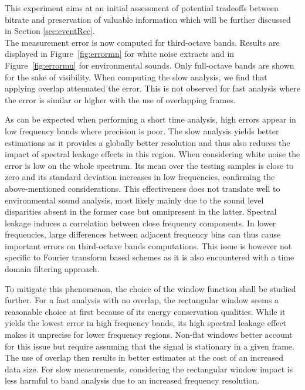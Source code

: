 \documentclass[sensors,article,submit,moreauthors,pdftex,10pt,a4paper]{mdpi}
\begin{document}
This experiment aims at an initial assessment of potential tradeoffs between bitrate and preservation of valuable information which will be further discussed in Section \ref{sec:eventRec}.\\

The measurement error is now computed for third-octave bands. Results are displayed in Figure~\ref{fig:errormn} for white noise extracts and in Figure~\ref{fig:errormu} for environmental sounds. Only full-octave bands are shown for the sake of visibility. When computing the slow analysis, we find that applying overlap attenuated the error. This is not observed for fast analysis where the error is similar or higher with the use of overlapping frames.

As can be expected when performing a short time analysis, high errors appear in low frequency bands where precision is poor. The slow analysis yields better estimations as it provides a globally better resolution and thus also reduces the impact of spectral leakage effects in this region. When considering white noise the error is low on the whole spectrum. Its mean over the testing samples is close to zero and its standard deviation increases in low frequencies, confirming the above-mentioned considerations. This effectiveness does not translate well to environmental sound analysis, most likely mainly due to the sound level disparities absent in the former case but omnipresent in the latter. Spectral leakage induces a correlation between close frequency components. In lower frequencies, large differences between adjacent frequency bins can thus cause important errors on third-octave bands computations. This issue is however not specific to Fourier transform based schemes as it is also encountered with a time domain filtering approach.

To mitigate this phenomenon, the choice of the window function shall be studied further. For a fast analysis with no overlap, the rectangular window seems a reasonable choice at first because of its energy conservation qualities. While it yields the lowest error in high frequency bands, its high spectral leakage effect makes it unprecise for lower frequency regions. Non-flat windows better account for this issue but require assuming that the signal is stationary in a given frame. The use of overlap then results in better estimates at the cost of an increased data size. For slow measurements, considering the rectangular window impact is less harmful to band analysis due to an increased frequency resolution.
\end{document}
